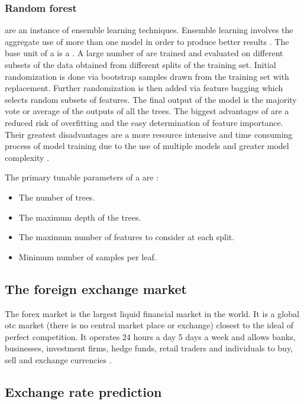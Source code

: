 \subsubsection{Random forest}\label{Random forest}

 are an instance of ensemble learning techniques. Ensemble learning involves the aggregate use of more than one model in order to produce better results \cite{ibm-ensemble}. The base unit of a  is a . A large number of  are trained and evaluated on different subsets of the data obtained from different splits of the training set. Initial randomization is done via bootstrap samples drawn from the training set with replacement. Further randomization is then added via feature bagging which selects random subsets of features. The final output of the model is the majority vote or average of the outputs of all the trees. The biggest advantages of  are a reduced risk of overfitting and the easy determination of feature importance. Their greatest disadvantages are a more resource intensive and time consuming process of model training due to the use of multiple models and greater model complexity \cite{prediction, ibm-rf}.

The primary tunable parameters of a  are \cite{prediction,ibm-rf}:
\begin{itemize}
    \item The number of trees.
    \item The maximum depth of the trees.
    \item The maximum number of features to consider at each split.
    \item Minimum number of samples per leaf.
\end{itemize}

\subsection{The foreign exchange market}\label{The foreign exchange market}

The \gls{forex} market is the largest liquid financial market in the world. It is a global \gls{otc} market (there is no central market place or exchange) closest to the ideal of perfect competition. It operates 24 hours a day 5 days a week and allows banks, businesses, investment firms, hedge funds, retail traders and individuals to buy, sell and exchange currencies \cite{forex}.

\subsection{Exchange rate prediction}\label{Exchange rate prediction}

